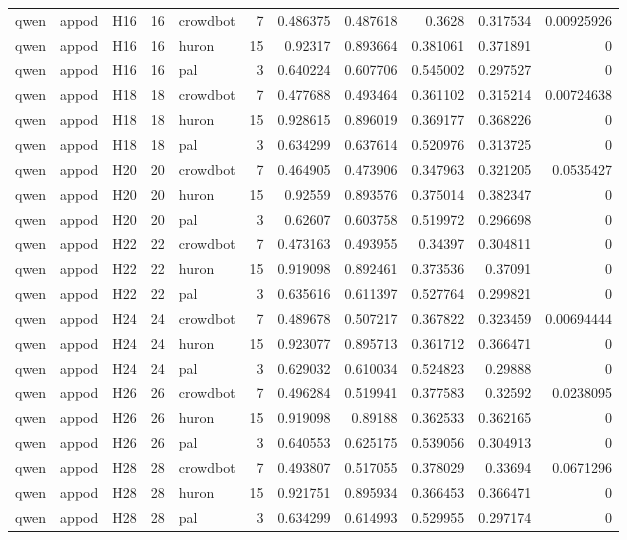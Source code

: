 \begin{longtable}{lllrlrrrrrr}
qwen & appod & H16 & 16 & crowdbot & 7 & 0.486375 & 0.487618 & 0.3628 & 0.317534 & 0.00925926 \\
qwen & appod & H16 & 16 & huron & 15 & 0.92317 & 0.893664 & 0.381061 & 0.371891 & 0 \\
qwen & appod & H16 & 16 & pal & 3 & 0.640224 & 0.607706 & 0.545002 & 0.297527 & 0 \\
qwen & appod & H18 & 18 & crowdbot & 7 & 0.477688 & 0.493464 & 0.361102 & 0.315214 & 0.00724638 \\
qwen & appod & H18 & 18 & huron & 15 & 0.928615 & 0.896019 & 0.369177 & 0.368226 & 0 \\
qwen & appod & H18 & 18 & pal & 3 & 0.634299 & 0.637614 & 0.520976 & 0.313725 & 0 \\
qwen & appod & H20 & 20 & crowdbot & 7 & 0.464905 & 0.473906 & 0.347963 & 0.321205 & 0.0535427 \\
qwen & appod & H20 & 20 & huron & 15 & 0.92559 & 0.893576 & 0.375014 & 0.382347 & 0 \\
qwen & appod & H20 & 20 & pal & 3 & 0.62607 & 0.603758 & 0.519972 & 0.296698 & 0 \\
qwen & appod & H22 & 22 & crowdbot & 7 & 0.473163 & 0.493955 & 0.34397 & 0.304811 & 0 \\
qwen & appod & H22 & 22 & huron & 15 & 0.919098 & 0.892461 & 0.373536 & 0.37091 & 0 \\
qwen & appod & H22 & 22 & pal & 3 & 0.635616 & 0.611397 & 0.527764 & 0.299821 & 0 \\
qwen & appod & H24 & 24 & crowdbot & 7 & 0.489678 & 0.507217 & 0.367822 & 0.323459 & 0.00694444 \\
qwen & appod & H24 & 24 & huron & 15 & 0.923077 & 0.895713 & 0.361712 & 0.366471 & 0 \\
qwen & appod & H24 & 24 & pal & 3 & 0.629032 & 0.610034 & 0.524823 & 0.29888 & 0 \\
qwen & appod & H26 & 26 & crowdbot & 7 & 0.496284 & 0.519941 & 0.377583 & 0.32592 & 0.0238095 \\
qwen & appod & H26 & 26 & huron & 15 & 0.919098 & 0.89188 & 0.362533 & 0.362165 & 0 \\
qwen & appod & H26 & 26 & pal & 3 & 0.640553 & 0.625175 & 0.539056 & 0.304913 & 0 \\
qwen & appod & H28 & 28 & crowdbot & 7 & 0.493807 & 0.517055 & 0.378029 & 0.33694 & 0.0671296 \\
qwen & appod & H28 & 28 & huron & 15 & 0.921751 & 0.895934 & 0.366453 & 0.366471 & 0 \\
qwen & appod & H28 & 28 & pal & 3 & 0.634299 & 0.614993 & 0.529955 & 0.297174 & 0 \\

\end{longtable}
